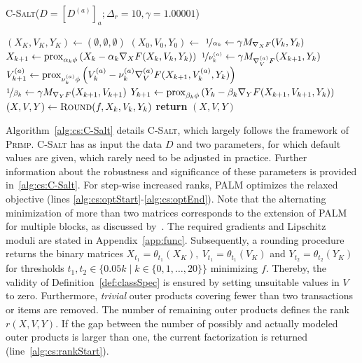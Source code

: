 \begin{algorithm}[t]
\caption{\textsc{C-Salt}($D=[D^{(a)}]_a;\Delta_r=10,\gamma=1.00001$)$\qquad$}
\begin{algorithmic}[1]
  \State $(X_K,V_K,Y_K)\gets (\emptyset, \emptyset, \emptyset)$
    \State $(X_0,V_0,Y_0) \gets $ 
    \label{alg:cs:optStart} 
      \State $\nicefrac{1}{\alpha_k} \gets \gamma M_{\nabla_XF}(V_k,Y_k)$ \label{alg:cs:stepX}
      \State $X_{k+1} \gets \operatorname{prox}_{\alpha_k\phi}\left(X_k-\alpha_k\nabla_XF(X_k,V_k,Y_k)\right)$ \label{alg:cs:proxX}
      \State $\nicefrac{1}{\nu_k^{(a)}} \gets \gamma M_{\nabla^{(a)}_VF}(X_{k+1},Y_k)$   \label{alg:cs:stepV}
      \State $V^{(a)}_{k+1} \gets \operatorname{prox}_{\nu_k^{(a)}\phi}\left(V^{(a)}_k-\nu_k^{(a)}\nabla^{(a)}_VF(X_{k+1},V_{k}^{(a)},Y_k)\right)$  \label{alg:cs:proxV}
      \State $\nicefrac{1}{\beta_k} \gets\gamma M_{\nabla_YF}(X_{k+1},V_{k+1})$  \label{alg:cs:stepY}
      \State $Y_{k+1} \gets \operatorname{prox}_{\beta_k\phi}\left(Y_k-\beta_k\nabla_YF(X_{k+1},V_{k+1},Y_k)\right)$ \label{alg:cs:proxY}
    \EndFor\label{alg:cs:optEnd}
    \State $(X,V,Y)\gets \Call{Round}{f,X_k,V_k,Y_k}$
    \label{alg:cs:rankStart}
    	\textbf{return} $(X,V,Y)$
    \EndIf\label{alg:cs:rankEnd}
    \EndFor
\end{algorithmic}
\label{alg:cs:C-Salt}
\end{algorithm}

Algorithm~\ref{alg:cs:C-Salt} details \textsc{C-Salt}, which largely follows the framework of \textsc{Primp}. \textsc{C-Salt} has as input the data $D$ and two parameters, for which default values are given, which rarely need to be adjusted in practice. Further information about the robustness and significance of these parameters is provided in~\ref{alg:cs:C-Salt}. For step-wise increased ranks, PALM optimizes the relaxed objective (lines \ref{alg:cs:optStart}-\ref{alg:cs:optEnd}). Note that the alternating minimization of more than two matrices corresponds to the extension of PALM for multiple blocks, as discussed by~\cite{bolte2014proximal}. The required gradients and Lipschitz moduli are stated in Appendix~\ref{app:func}. Subsequently, a rounding procedure  returns the binary matrices $X_{t_1}=\theta_{t_1}(X_K),\ V_{t_1}=\theta_{t_1}(V_K)$  and $Y_{t_2}=\theta_{t_2}(Y_K)$ for thresholds $t_1,t_2\in\{0.05k\mid k\in\{0,1,\ldots,20\}\}$ minimizing $f$. Thereby, the validity of Definition~\ref{def:classSpec} is ensured by setting unsuitable values in $V$ to zero. Furthermore, \textit{trivial} outer products covering fewer than two transactions or items are removed. The number of remaining outer products defines the rank $r(X,V,Y)$. If the gap between the number of possibly and actually modeled outer products is larger than one, the current factorization is returned (line~\ref{alg:cs:rankStart}).
